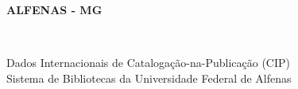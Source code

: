 \begin{center}
\begin{singlespace}

\vfill

\textbf{ALFENAS - MG\\ \teseyear}
\end{singlespace}
\end{center}


\newpage
\textcolor{white}{fantasma}

\vfill
\begin{center}
\begin{singlespace}
Dados Internacionais de Catalogação-na-Publicação (CIP) \\
Sistema de Bibliotecas da Universidade Federal de Alfenas
\vspace{-0.2cm}
\end{singlespace}
\end{center}
